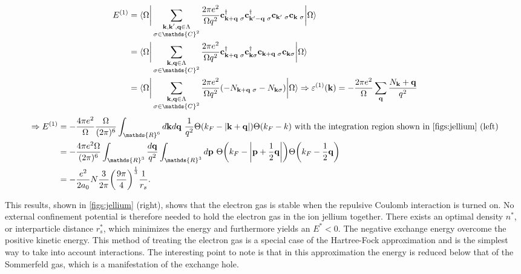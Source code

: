\documentclass{homework}
\begin{document}
\begin{equation}
    \begin{split}
        E^{(1)} &= \langle {\Omega} \bigg|  \sum_{\substack{{\bf k},{\bf k}',{\bf q} \in \Lambda\\
    \sigma \in \mathds{C}^2}} \frac{2\pi e^2}{\Omega q^2} {\bf c}_{{\bf k}+{\bf q} \blanky \sigma}^\dagger {\bf c}_{{\bf k}'-{\bf q} \blanky \sigma}^\dagger {\bf c}_{{\bf k}' \blanky \sigma} {\bf c}_{{\bf k} \blanky \sigma} \bigg| {\Omega} \rangle \\
    &= \langle {\Omega} \bigg|  \sum_{\substack{{\bf k},{\bf q} \in \Lambda\\
    \sigma \in \mathds{C}^2}} \frac{2\pi e^2}{\Omega q^2} {\bf c}_{{\bf k}+{\bf q} \blanky \sigma}^\dagger {\bf c}_{{\bf k} \sigma}^\dagger {\bf c}_{{\bf k}+{\bf q} \blanky \sigma} {\bf c}_{{\bf k} \sigma} \bigg| {\Omega} \rangle \\
    &= \langle {\Omega} \bigg|  \sum_{\substack{{\bf k},{\bf q} \in \Lambda\\
    \sigma \in \mathds{C}^2}} \frac{2\pi e^2}{\Omega q^2} (-N_{{\bf k}+{\bf q} \blanky \sigma} - N_{{\bf k} \sigma}) \bigg| {\Omega} \rangle  \Rightarrow \varepsilon^{(1)}({\bf k}) = - \frac{2\pi e^2}{\Omega} \sum_{{\bf q}} \frac{N_{{\bf k}} + {\bf q}}{q^2} \\
    \end{split}
\end{equation}
\begin{equation}
    \begin{split}
    \Rightarrow E^{(1)} &= -\frac{4\pi e^2}{\Omega} \frac{\Omega}{(2\pi)^6} \int_{\mathds{R}^6} d{\bf k} d{\bf q} \blanky \frac{1}{q^2} \Theta(k_F - |{\bf k} + {\bf q}|) \Theta(k_F - k) \textnormal{ with the integration region shown in \cref{figs:jellium} (left)}  \\
    &= - \frac{4\pi e^2 \Omega}{(2\pi)^6} \int_{\mathds{R}^3} \frac{d{\bf q}}{q^2} \int_{\mathds{R}^3} d{\bf p} \blanky \Theta\bigg(k_F - \bigg| {\bf p} + \frac{1}{2} {\bf q}\bigg|\bigg) \Theta\bigg(k_F - \frac{1}{2} {\bf q}\bigg) \\
    &= -\frac{e^2}{2a_0} N \frac{3}{2\pi} \bigg(\frac{9 \pi}{4}\bigg)^{\frac{1}{3}} \frac{1}{r_s}.
    \end{split}
\end{equation}

This results, shown in \cref{figs:jellium} (right), shows that the electron gas is stable when the repulsive Coulomb interaction is turned on. No external confinement potential is therefore needed to hold the electron gas in the ion jellium together. There exists an optimal density $n^*$, or interparticle distance $r_s^*$, which minimizes the energy and furthermore yields an $E^* < 0$. The negative exchange energy overcome the positive kinetic energy. This method of treating the electron gas is a special case of the Hartree-Fock approximation and is the simplest way to take into account interactions. The interesting point to note is that in this approximation the energy is reduced below that of the Sommerfeld gas, which is a manifestation of the exchange hole. 
\end{document}
